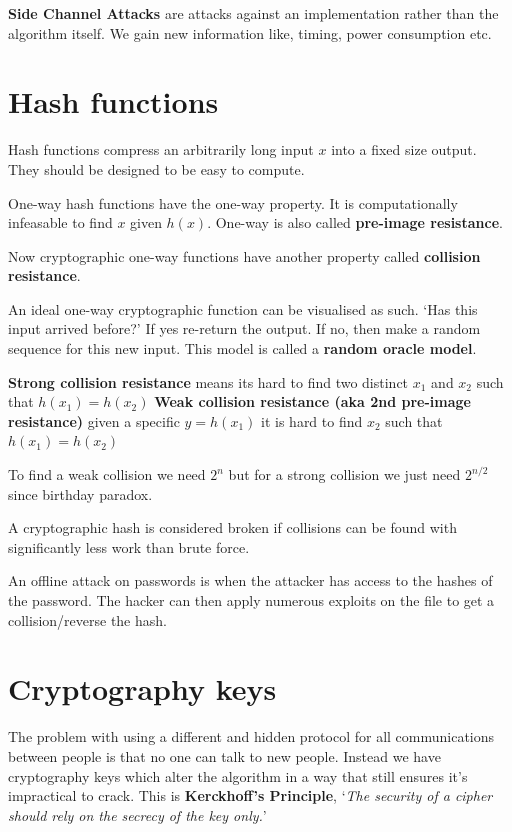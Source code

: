 \documentclass{report}
\begin{document}
\textbf{Side Channel Attacks} are attacks against an implementation rather than
the algorithm itself. We gain new information like, timing, power consumption
etc.

\section{Hash functions}
Hash functions compress an arbitrarily long input $x$ into a fixed size output.
They should be designed to be easy to compute.

One-way hash functions have the one-way property. It is computationally
infeasable to find $x$ given $h(x)$.
One-way is also called \textbf{pre-image resistance}.

Now cryptographic one-way functions have another property called
\textbf{collision resistance}.

An ideal one-way cryptographic function can be visualised as such.
`Has this input arrived before?' If yes re-return the output. If no, then
make a random sequence for this new input.
This model is called a \textbf{random oracle model}.

\textbf{Strong collision resistance} means its hard to find two distinct
$x_1$ and $x_2$ such that $h(x_1) = h(x_2)$
\textbf{Weak collision resistance (aka 2nd pre-image resistance)}
given a specific
$y=h(x_1)$ it is hard to find $x_2$ such that $h(x_1) = h(x_2)$

To find a weak collision we need $2^n$ but for a strong collision we just need
$2^{n/2}$ since birthday paradox.

A cryptographic hash is considered broken if collisions can be found with
significantly less work than brute force.

An offline attack on passwords is when the attacker has access to the hashes
of the password. The hacker can then apply numerous exploits on the file
to get a collision/reverse the hash.

\section{Cryptography keys}
The problem with using a different and hidden protocol for all communications
between people is that no one can talk to new people. Instead we have
cryptography keys which alter the algorithm in a way that still ensures it's
impractical to crack. This is \textbf{Kerckhoff's Principle},
`\textit{The security of a cipher should rely on the secrecy of the key only.}'
\end{document}
